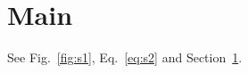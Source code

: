 \documentclass{article}
\begin{document}
\section{Main}\label{sec:main}
See Fig.~\ref{fig:s1}, Eq.~\eqref{eq:s2} and Section~\ref{sec:main}.
\end{document}
